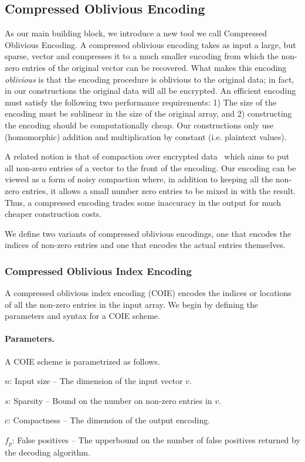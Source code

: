 \subsection{Compressed Oblivious Encoding}
As our main building block, we introduce a new tool we call Compressed Oblivious Encoding.  A compressed oblivious encoding takes as input a large, but sparse, vector and compresses it to a much smaller encoding from which the non-zero entries of the original vector can be recovered.  What makes this encoding \emph{oblivious} is that the encoding procedure is oblivious to the original data; in fact, in our constructions the original data will all be encrypted.  An efficient encoding must satisfy the following two performance requirements: 1) The size of the encoding must be sublinear in the size of the original array, and 2) constructing the encoding should be computationally cheap. Our constructions only use (homomorphic) addition and multiplication by constant (i.e. plaintext values).


A related notion is that of compaction over encrypted data~\cite{eprint:BlaAgu11,EC:AKLNPS20} which aims to put all non-zero entries of a vector to the front of the encoding.  Our encoding can be viewed as a form of noisy compaction where, in addition to keeping all the non-zero entries, it allows a small number zero entries to be mixed in with the result.  Thus, a compressed encoding trades some inaccuracy in the output for much cheaper construction costs.

We define two variants of compressed oblivious encodings, one that encodes the indices of non-zero entries and one that encodes the actual entries themselves.

\subsubsection{Compressed Oblivious Index Encoding}
A compressed oblivious index encoding (COIE) encodes the indices or locations of all the non-zero entries in the input array.  We begin by defining the parameters and syntax for a COIE scheme.

\paragraph{Parameters.} A COIE scheme is parametrized as follows. 

  \BI 
  \item $n$: Input size -- The dimension of the input vector $v$.
  \item $s$: Sparsity -- Bound on the number on non-zero entries in $v$.
  \item $c$: Compactness -- The dimension of the output encoding.
  \item $f_p$: False positives -- The upperbound on the number of false
  positives returned by the decoding algorithm.
  \EI

